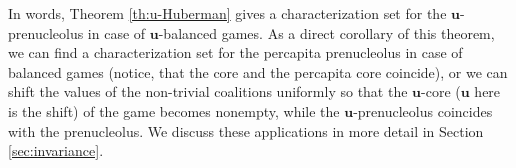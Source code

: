 \documentclass[a4paper,12pt]{article}
\theoremstyle{definition}
\theoremstyle{remark}
\begin{document}
In words, Theorem \ref{th:u-Huberman} gives a characterization set for the $\mathbf{u}$-prenucleolus in case of $\mathbf{u}$-balanced games. As a direct corollary of this theorem, we can find a characterization set for the percapita prenucleolus in case of balanced games (notice, that the core and the percapita core coincide), or we can shift the values of the non-trivial coalitions uniformly so that the $\mathbf{u}$-core ($\mathbf{u}$ here is the shift) of the game becomes nonempty, while the $\mathbf{u}$-prenucleolus coincides with the prenucleolus. We discuss these applications in more detail in Section \ref{sec:invariance}.






\end{document}
